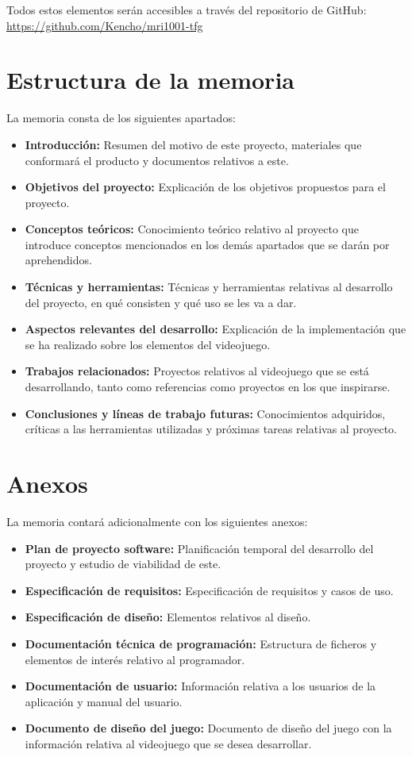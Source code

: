 Todos estos elementos serán accesibles a través del repositorio de GitHub: \url{https://github.com/Kencho/mri1001-tfg}

\section{Estructura de la memoria}
La memoria consta de los siguientes apartados:
\begin{itemize}
\item
\textbf{Introducción:} Resumen del motivo de este proyecto, materiales que conformará el producto y documentos relativos a este.
\item
\textbf{Objetivos del proyecto:} Explicación de los objetivos propuestos para el proyecto.
\item
\textbf{Conceptos teóricos:} Conocimiento teórico relativo al proyecto que introduce conceptos mencionados en los demás apartados que se darán por aprehendidos.
\item
\textbf{Técnicas y herramientas:} Técnicas y herramientas relativas al desarrollo del proyecto, en qué consisten y qué uso se les va a dar.
\item
\textbf{Aspectos relevantes del desarrollo:} Explicación de la implementación que se ha realizado sobre los elementos del videojuego.
\item
\textbf{Trabajos relacionados:} Proyectos relativos al videojuego que se está desarrollando, tanto como referencias como proyectos en los que inspirarse.
\item
\textbf{Conclusiones y líneas de trabajo futuras:} Conocimientos adquiridos, críticas a las herramientas utilizadas y próximas tareas relativas al proyecto.
\end{itemize}

\section{Anexos}
La memoria contará adicionalmente con los siguientes anexos:
\begin{itemize}
\item
\textbf{Plan de proyecto software:} Planificación temporal del desarrollo del proyecto y estudio de viabilidad de este.
\item
\textbf{Especificación de requisitos:} Especificación de requisitos y casos de uso.
\item
\textbf{Especificación de diseño:} Elementos relativos al diseño.
\item
\textbf{Documentación técnica de programación:} Estructura de ficheros y elementos de interés relativo al programador.
\item
\textbf{Documentación de usuario:} Información relativa a los usuarios de la aplicación y manual del usuario.
\item
\textbf{Documento de diseño del juego:} Documento de diseño del juego con la información relativa al videojuego que se desea desarrollar.
\end{itemize}